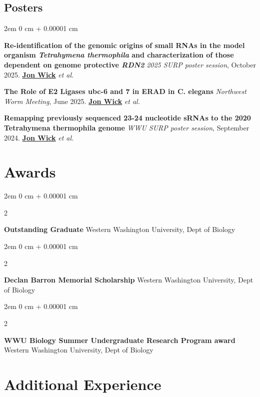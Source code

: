 \documentclass[11pt]{article}
\newcommand{\secrule}{\ \raisebox{0.5ex}{\hrulefill}}
\newenvironment{onecolentry}{
    \begin{adjustwidth}{
        2em
    }{
        0 cm + 0.00001 cm
    }
}{
    \end{adjustwidth}
} %
\newenvironment{twocolentry}[2][]{
    \onecolentry
    \def\secondColumn{#2}
    \setcolumnwidth{\fill, 5.5 cm}
    \begin{paracol}{2}
}{
    \switchcolumn \raggedleft \secondColumn
    \end{paracol}
    \endonecolentry
} %
\begin{document}
\begin{samepage}

	\section{Posters\secrule}

	\begin{onecolentry}
		\textbf{Re-identification of the genomic origins of small RNAs in the model organism \textit{Tetrahymena thermophila} and characterization of those dependent on genome protective \textit{RDN2}} \newline
		\textit{2025 SURP poster session}, October 2025. \underline{\textbf{Jon Wick}} \textit{et al.}

		\textbf{The Role of E2 Ligases ubc-6 and 7 in ERAD in C. elegans} \newline
		\textit{Northwest Worm Meeting}, June 2025. \underline{\textbf{Jon Wick}} \textit{et al.}

		\textbf{Remapping previously sequenced 23-24 nucleotide sRNAs to the 2020 Tetrahymena thermophila genome}\newline
		\textit{WWU SURP poster session}, September 2024. \underline{\textbf{Jon Wick}} \textit{et al.}
	\end{onecolentry}
\end{samepage}

\section{Awards\secrule}
\begin{twocolentry}
	{2026}
	\textbf{Outstanding Graduate} \newline
	Western Washington University, Dept of Biology
\end{twocolentry}
\begin{twocolentry}
	{2025}
	\textbf{Declan Barron Memorial Scholarship} \newline
	Western Washington University, Dept of Biology
\end{twocolentry}
\begin{twocolentry}
	{2025}
	\textbf{WWU Biology Summer Undergraduate Research Program award} \newline
	Western Washington University, Dept of Biology
\end{twocolentry}



\section{Additional Experience\secrule}
\end{document}
